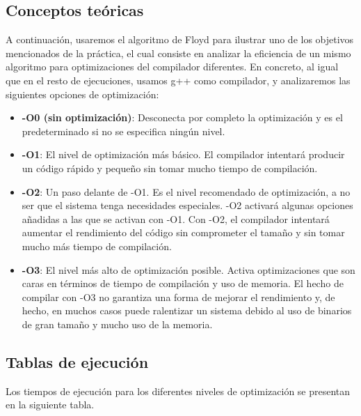 \documentclass{homework}
\begin{document}
    \subsection{Conceptos teóricas}

    A continuación, usaremos el algoritmo de Floyd para ilustrar uno de los objetivos mencionados de la práctica, 
    el cual consiste en analizar la eficiencia de un mismo algoritmo para optimizaciones del compilador diferentes.
    En concreto, al igual que en el resto de ejecuciones, usamos g++ como compilador, y analizaremos las siguientes
    opciones de optimización:

    \begin{itemize}
        \item \textbf{-O0 (sin optimización)}: Desconecta por completo la optimización y es el predeterminado si 
        no se especifica ningún nivel.
        \item \textbf{-O1}: El nivel de optimización más básico. El compilador intentará producir un código rápido
        y pequeño sin tomar mucho tiempo de compilación. 
        \item \textbf{-O2}: Un paso delante de -O1. Es el nivel recomendado de optimización, a no ser que el sistema
        tenga necesidades especiales. -O2 activará algunas opciones añadidas a las que se activan con -O1. 
        Con -O2, el compilador intentará aumentar el rendimiento del código sin comprometer el tamaño y sin tomar 
        mucho más tiempo de compilación.
        \item \textbf{-O3}:  El nivel más alto de optimización posible. Activa optimizaciones que son caras en términos 
        de tiempo de compilación y uso de memoria. El hecho de compilar con -O3 no garantiza una forma de mejorar el 
        rendimiento y, de hecho, en muchos casos puede ralentizar un sistema debido al uso de binarios de gran tamaño y 
        mucho uso de la memoria.
    \end{itemize} 
    
    \subsection{Tablas de ejecución} 

    Los tiempos de ejecución para los diferentes niveles de optimización se presentan en la siguiente tabla. 
\end{document}
